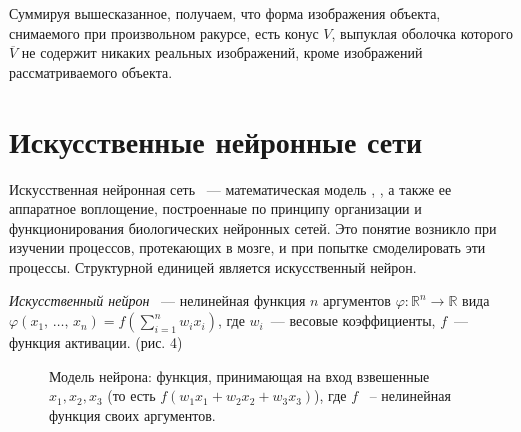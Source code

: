 \documentclass[a4paper, 12pt]{article}
\def\RR{\mathbb{R}}
\newcommand{\ol}{\overline}
\begin{document}
Суммируя вышесказанное, получаем, что форма изображения объекта, снимаемого при произвольном ракурсе, есть конус $V$, выпуклая оболочка которого $\ol V$ не содержит никаких реальных изображений, кроме изображений рассматриваемого объекта.


\section{Искусственные нейронные сети}
Искусственная нейронная сеть ~--- математическая модель \cite{DudaHurt}, \cite{Bishop}, а также ее аппаратное воплощение, построеннаые по принципу организации и функционирования биологических нейронных сетей. Это понятие возникло при изучении процессов, протекающих в мозге, и при попытке смоделировать эти процессы. Структурной единицей является искусственный нейрон.

\emph{Искусственный нейрон} ~--- нелинейная функция $n$ аргументов $\varphi: \RR^n\to\RR$ вида $\varphi(x_1,\, \ldots,\, x_n) = f\left( \sum\limits_{i=1}^n w_ix_i \right)$, где $w_i$~--- весовые коэффициенты,\;\;\; $f$~--- функция активации. (рис. 4)
\begin{figure}[htb!]
\centering
{}



\caption{Модель нейрона: функция, принимающая на вход взвешенные $x_1, x_2, x_3$ (то есть $f(w_1 x_1 + w_2 x_2 + w_3 x_3)$), где $f$ ~-- нелинейная функция своих аргументов.}
\label{neuron}
\end{figure}
\hfill
\end{document}
